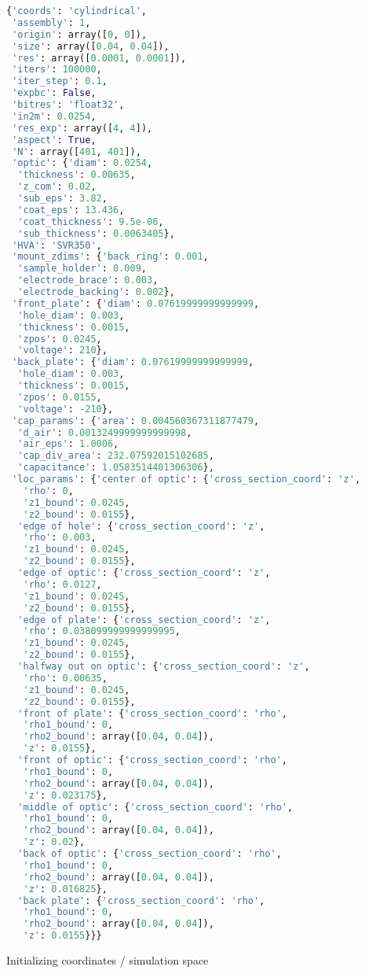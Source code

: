 \begin{spacing}{1.2} \begin{lstlisting}[frame=single, language=Python]
{'coords': 'cylindrical',
 'assembly': 1,
 'origin': array([0, 0]),
 'size': array([0.04, 0.04]),
 'res': array([0.0001, 0.0001]),
 'iters': 100000,
 'iter_step': 0.1,
 'expbc': False,
 'bitres': 'float32',
 'in2m': 0.0254,
 'res_exp': array([4, 4]),
 'aspect': True,
 'N': array([401, 401]),
 'optic': {'diam': 0.0254,
  'thickness': 0.00635,
  'z_com': 0.02,
  'sub_eps': 3.82,
  'coat_eps': 13.436,
  'coat_thickness': 9.5e-06,
  'sub_thickness': 0.0063405},
 'HVA': 'SVR350',
 'mount_zdims': {'back_ring': 0.001,
  'sample_holder': 0.009,
  'electrode_brace': 0.003,
  'electrode_backing': 0.002},
 'front_plate': {'diam': 0.07619999999999999,
  'hole_diam': 0.003,
  'thickness': 0.0015,
  'zpos': 0.0245,
  'voltage': 210},
 'back_plate': {'diam': 0.07619999999999999,
  'hole_diam': 0.003,
  'thickness': 0.0015,
  'zpos': 0.0155,
  'voltage': -210},
 'cap_params': {'area': 0.004560367311877479,
  'd_air': 0.0013249999999999998,
  'air_eps': 1.0006,
  'cap_div_area': 232.07592015102685,
  'capacitance': 1.0583514401306306},
 'loc_params': {'center of optic': {'cross_section_coord': 'z',
   'rho': 0,
   'z1_bound': 0.0245,
   'z2_bound': 0.0155},
  'edge of hole': {'cross_section_coord': 'z',
   'rho': 0.003,
   'z1_bound': 0.0245,
   'z2_bound': 0.0155},
  'edge of optic': {'cross_section_coord': 'z',
   'rho': 0.0127,
   'z1_bound': 0.0245,
   'z2_bound': 0.0155},
  'edge of plate': {'cross_section_coord': 'z',
   'rho': 0.038099999999999995,
   'z1_bound': 0.0245,
   'z2_bound': 0.0155},
  'halfway out on optic': {'cross_section_coord': 'z',
   'rho': 0.00635,
   'z1_bound': 0.0245,
   'z2_bound': 0.0155},
  'front of plate': {'cross_section_coord': 'rho',
   'rho1_bound': 0,
   'rho2_bound': array([0.04, 0.04]),
   'z': 0.0155},
  'front of optic': {'cross_section_coord': 'rho',
   'rho1_bound': 0,
   'rho2_bound': array([0.04, 0.04]),
   'z': 0.023175},
  'middle of optic': {'cross_section_coord': 'rho',
   'rho1_bound': 0,
   'rho2_bound': array([0.04, 0.04]),
   'z': 0.02},
  'back of optic': {'cross_section_coord': 'rho',
   'rho1_bound': 0,
   'rho2_bound': array([0.04, 0.04]),
   'z': 0.016825},
  'back plate': {'cross_section_coord': 'rho',
   'rho1_bound': 0,
   'rho2_bound': array([0.04, 0.04]),
   'z': 0.0155}}}
\end{lstlisting} \end{spacing}

\noindent Initializing coordinates / simulation space

